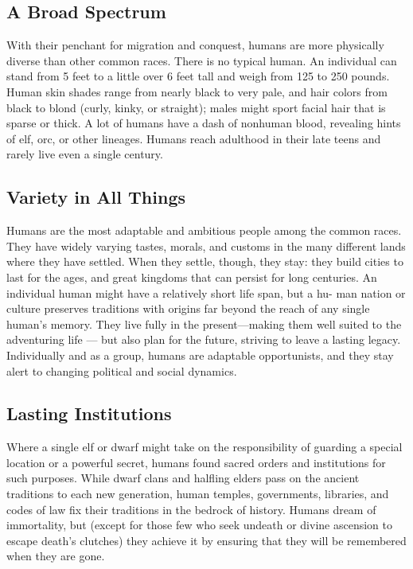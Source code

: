 \subsection{A Broad Spectrum}
With their penchant for migration and conquest, humans are more physically diverse than other common races. There is no typical human. An individual can stand from 5 feet to a little over 6 feet tall and weigh from 125 to 250 pounds. Human skin shades range from nearly black to very pale, and hair colors from black to blond (curly, kinky, or straight); males might sport facial hair that is sparse or thick. A lot of humans have a dash of nonhuman blood, revealing hints of elf, orc, or other lineages. Humans reach adulthood in their late teens and rarely live even a single century.

\subsection{Variety in All Things}
Humans are the most adaptable and ambitious people among the common races. They have widely varying tastes, morals, and customs in the many different lands where they have settled. When they settle, though, they stay: they build cities to last for the ages, and great kingdoms that can persist for long centuries. An individual human might have a relatively short life span, but a hu- man nation or culture preserves traditions with origins far beyond the reach of any single human’s memory. They live fully in the present—making them well suited to the adventuring life — but also plan for the future, striving to leave a lasting legacy. Individually and as a group, humans are adaptable opportunists, and they stay alert to changing political and social dynamics.

\subsection{Lasting Institutions}
Where a single elf or dwarf might take on the responsibility of guarding a special location or a powerful secret, humans found sacred orders and institutions for such purposes. While dwarf clans and halfling elders pass on the ancient traditions to each new generation, human temples, governments, libraries, and codes of law fix their traditions in the bedrock of history. Humans dream of immortality, but (except for those few who seek undeath or divine ascension to escape death’s clutches) they achieve it by ensuring that they will be remembered when they are gone.

